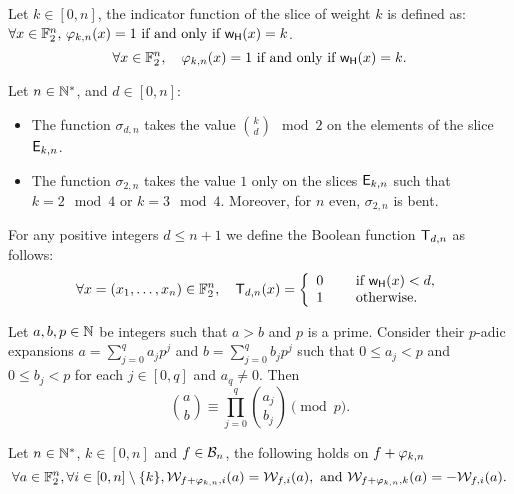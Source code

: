 \documentclass{llncs}
\begin{document}
\begin{definition}\label{def:sliceind}
 Let $k\in [0,n]$, the indicator function of the slice of weight $k$ is defined as: 
 \ifnum{}
  $\forall  x\in \mathbb{F}_2^{n}, \, \varphi_{k,n}(x) = 1 \text{ if and only if } \mathsf{w_H}(x) = k$.
 \else
 \[\forall  x\in \mathbb{F}_2^{n}, \quad \varphi_{k,n}(x) = 1 \text{ if and only if } \mathsf{w_H}(x) = k.\]
  \fi
\end{definition}
\fi




\ifnum{}
\else
\begin{Prop}\label{prop:sigma}
	Let $n\in \mathbb{N}^*$, and $d\in [0,n]$:
	\begin{itemize}
		\item The function $\sigma_{d,n}$ takes the value $\binom{k}{d}\mod 2$ on the elements of the slice $\mathsf{E}_{k,n}$.
		\item The function $\sigma_{2,n}$ takes the value $1$ only on the slices $\mathsf{E}_{k,n}$ such that $k=2\mod 4$ or $k=3 \mod 4$. Moreover, for $n$ even, $\sigma_{2,n}$ is bent.
		
	\end{itemize}	
\end{Prop}

\begin{definition}\label{def:thr}
	For any positive integers $d \leq n+1$ we define the Boolean function $\mathsf{T}_{{d},{n}}$ as follows:
	\[ \forall x=(x_1,\dots,x_n) \in \mathbb{F}_2^{n}, \quad \mathsf{T}_{{d},{n}}(x)  = \left\{ 
	\begin{array}{l l}
	0 & \quad \text{ if } \mathsf{w_H}(x) <d, \\
	1 & \quad \text{ otherwise. }
	\end{array} \right.   \]  
\end{definition}


\begin{Prop}\label{prop:Lucas}
	Let $a,b,p \in \mathbb{N}$ be integers such that $a>b$ and $p$ is a prime. Consider their $p$-adic expansions
	$a=\sum_{j=0}^q a_jp^j$ and $b=\sum_{j=0}^q b_jp^j$ such that $0\le a_j<p$ and $0\le b_j<p$ for each $j\in[0,q]$ and $a_q\ne 0$. Then
	\[\binom{a}{b} \equiv \prod_{j=0}^q \binom{a_j}{b_j} \pmod p.
	\]	
\end{Prop}

\begin{Prop}\label{prop:AddSym}
	Let $n\in \mathbb{N}^*$, $k\in [0,n]$ and $f \in \mathcal{B}_{n}$, the following holds on $f+\varphi_{k,n}$
	\[\forall a\in \mathbb{F}_2^n, \forall i\in [0,n]\setminus \{k\}, \mathcal{W}_{f+\varphi_{k,n},i}(a)=\mathcal{W}_{f,i}(a),\text{ and } \mathcal{W}_{f+\varphi_{k,n},k}(a)=-\mathcal{W}_{f,i}(a).\]	
\end{Prop}
\end{document}
